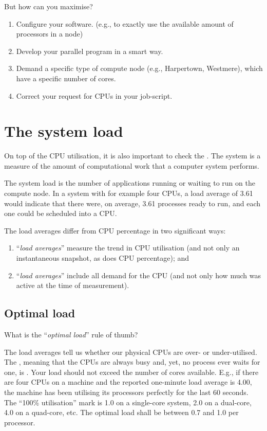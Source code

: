 But how can you maximise?

\begin{enumerate}
\item  Configure your software. (e.g., to exactly use the available amount of processors in a node)
\item  Develop your parallel program in a smart way.
\item  Demand a specific type of compute node (e.g., Harpertown, Westmere), which have a specific number of cores.
\item  Correct your request for CPUs in your job-script.
\end{enumerate}

\section{The system load}

On top of the CPU utilisation, it is also important to check the .  The system  is a measure of the amount of computational
work that a computer system performs.

The system load is the number of applications running or waiting to run on the
compute node.  In a system with for example four CPUs, a load average of 3.61
would indicate that there were, on average, 3.61 processes ready to run, and
each one could be scheduled into a CPU.

The load averages differ from CPU percentage in two significant ways:

\begin{enumerate}
\item  ``\emph{load averages}'' measure the trend in CPU utilisation (and not only an instantaneous snapshot, as does CPU percentage); and
\item  ``\emph{load averages}'' include all demand for the CPU (and not only how much was active at the time of measurement).
\end{enumerate}

\subsection{Optimal load}

What is the ``\emph{optimal load}'' rule of thumb?

The load averages tell us whether our physical CPUs are over- or
under-utilised. The , meaning that the
CPUs are always busy and, yet, no process ever waits for one, is .  Your load should not exceed the number
of cores available.  E.g., if there are four CPUs on a machine and the reported
one-minute load average is 4.00, the machine has been utilising its processors
perfectly for the last 60 seconds. The ``100\% utilisation'' mark is 1.0 on a
single-core system, 2.0 on a dual-core, 4.0 on a quad-core, etc. The optimal
load shall be between 0.7 and 1.0 per processor.

